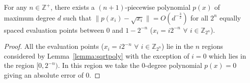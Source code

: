 \begin{duplicate}
For any $n \in \mathbb{Z}^+$, there exists a $(n+1)$-piecewise polynomial $p(x)$ of maximum degree $d$ such that $\|p(x_i)- \sqrt{x_i}\| = O(d^{-\frac{3}{2}})$ for all $2^n$ equally spaced evaluation points between $0$ and $1-2^{-n}$ ($x_i = i2^{-n}$ $\forall$ $i \in \mathbb{Z}_{2^n}$).
\end{duplicate}
\begin{proof}
    All the evaluation points ($x_i = i2^{-n}$ $\forall$ $i \in \mathbb{Z}_{2^n}$) lie in the $n$ regions considered by Lemma~\ref{lemma:sqrtpoly} with the exception of $i = 0$ which lies in the region $[0, 2^{-n})$. In this region we take the 0-degree polynomial $p(x) = 0$ giving an absolute error of 0.
\end{proof}
